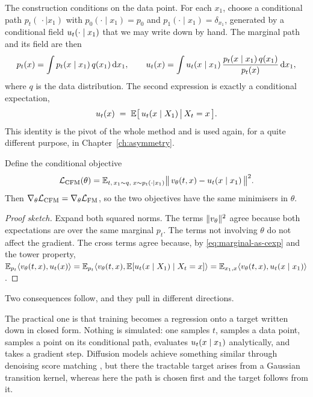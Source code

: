 The construction conditions on the data point. For each $x_1$, choose a
conditional path $p_t(\,\cdot \mid x_1)$ with $p_0(\cdot \mid x_1) = p_0$ and
$p_1(\cdot \mid x_1) = \delta_{x_1}$, generated by a conditional field
$u_t(\cdot \mid x_1)$ that we may write down by hand. The marginal path
and its field are then
\begin{equation}
  p_t(x) = \int p_t(x \mid x_1)\, q(x_1)\, \mathrm{d} x_1,
  \qquad
  u_t(x) = \int u_t(x \mid x_1)\,
  \frac{p_t(x \mid x_1)\, q(x_1)}{p_t(x)}\, \mathrm{d} x_1 ,
  \label{eq:marginal-field}
\end{equation}
where $q$ is the data distribution. The second expression is exactly a
conditional expectation,
\begin{equation}
  u_t(x) \;=\; \mathbb{E}\bigl[\,u_t(x \mid X_1) \,\big|\, X_t = x\,\bigr] .
  \label{eq:marginal-as-cexp}
\end{equation}
This identity is the pivot of the whole method and is used again, for a quite
different purpose, in Chapter~\ref{ch:asymmetry}.

\begin{proposition}[Marginalisation]
\label{prop:marginalisation}
Define the conditional objective
\begin{equation}
  \mathcal{L}_{\mathrm{CFM}}(\theta)
  = \mathbb{E}_{t,\,x_1 \sim q,\; x \sim p_t(\cdot \mid x_1)}
    \bigl\|\,v_\theta(t,x) - u_t(x \mid x_1)\,\bigr\|^2 .
  \label{eq:cfm-loss}
\end{equation}
Then $\nabla_\theta \mathcal{L}_{\mathrm{CFM}} = \nabla_\theta \mathcal{L}_{\mathrm{FM}}$,
so the two objectives have the same minimisers in $\theta$.
\end{proposition}

\begin{proof}[Proof sketch]
Expand both squared norms. The terms $\|v_\theta\|^2$ agree because both
expectations are over the same marginal $p_t$. The terms not involving
$\theta$ do not affect the gradient. The cross terms agree because, by
\eqref{eq:marginal-as-cexp} and the tower property,
$\mathbb{E}_{p_t}\langle v_\theta(t,x), u_t(x)\rangle
 = \mathbb{E}_{p_t}\langle v_\theta(t,x), \mathbb{E}[u_t(x\mid X_1)\mid X_t=x]\rangle
 = \mathbb{E}_{x_1, x}\langle v_\theta(t,x), u_t(x \mid x_1)\rangle$.
\end{proof}

Two consequences follow, and they pull in different directions.

The practical one is that training becomes a regression onto a target written
down in closed form. Nothing is simulated: one samples $t$, samples a data
point, samples a point on its conditional path, evaluates
$u_t(x \mid x_1)$ analytically, and takes a gradient step. Diffusion
models achieve something similar through denoising score matching
\citep{vincent2011connection}, but there the tractable target arises from a
Gaussian transition kernel, whereas here the path is chosen first and the
target follows from it.

